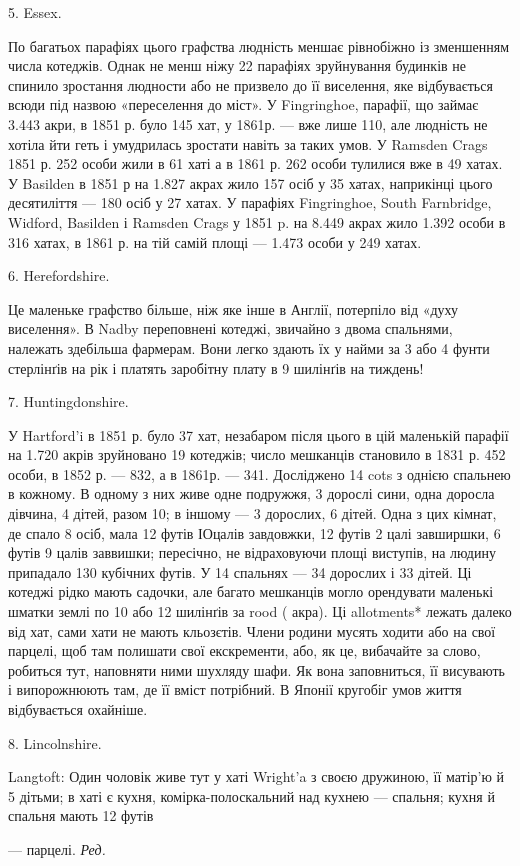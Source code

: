 5. Essex.

По багатьох парафіях цього графства людність меншає рівнобіжно
із зменшенням числа котеджів. Однак не менш ніжу
22 парафіях зруйнування будинків не спинило зростання людности
або не призвело до її виселення, яке відбувається всюди під
назвою «переселення до міст». У Fingringhoe, парафії, що займає
3.443 акри, в 1851 р. було 145 хат, у 1861р. — вже лише 110, але
людність не хотіла йти геть і умудрилась зростати навіть за
таких умов. У Ramsden Crags 1851 р. 252 особи жили в 61 хаті
а в 1861 р. 262 особи тулилися вже в 49 хатах. У Basilden в 1851 р
на 1.827 акрах жило 157 осіб у 35 хатах, наприкінці цього десятиліття
— 180 осіб у 27 хатах. У парафіях Fingringhoe, South
Farnbridge, Widford, Basilden і Ramsden Crags у 1851 p. на
8.449 акрах жило 1.392 особи в 316 хатах, в 1861 р. на тій самій
площі — 1.473 особи у 249 хатах.

6. Herefordshire.

Це маленьке графство більше, ніж яке інше в Англії, потерпіло
від «духу виселення». В Nadby переповнені котеджі,
звичайно з двома спальнями, належать здебільша фармерам.
Вони легко здають їх у найми за 3 або 4 фунти стерлінґів на рік
і платять заробітну плату в 9 шилінґів на тиждень!

7. Huntingdonshire.

У Hartford’i в 1851 р. було 37 хат, незабаром після цього
в цій маленькій парафії на 1.720 акрів зруйновано 19 котеджів;
число мешканців становило в 1831 р. 452 особи, в 1852 р. — 832,
а в 1861р. — 341. Досліджено 14 cots з однією спальнею в кожному.
В одному з них живе одне подружжя, 3 дорослі сини, одна
доросла дівчина, 4 дітей, разом 10; в іншому — 3 дорослих,
6 дітей. Одна з цих кімнат, де спало 8 осіб, мала 12 футів ІОцалів
завдовжки, 12 футів 2 цалі завширшки, 6 футів 9 цалів заввишки;
пересічно, не відраховуючи площі виступів, на людину припадало
130 кубічних футів. У 14 спальнях — 34 дорослих і 33 дітей. Ці
котеджі рідко мають садочки, але багато мешканців могло орендувати
маленькі шматки землі по 10 або 12 шилінґів за rood ( акра).
Ці allotments* лежать далеко від хат, сами хати не мають кльозєтів.
Члени родини мусять ходити або на свої парцелі, щоб там
полишати свої екскременти, або, як це, вибачайте за слово, робиться
тут, наповняти ними шухляду шафи. Як вона заповниться,
її висувають і випорожнюють там, де її вміст потрібний. В Японії
кругобіг умов життя відбувається охайніше.

8. Lincolnshire.

Langtoft: Один чоловік живе тут у хаті Wright’a з своєю дружиною,
її матір’ю й 5 дітьми; в хаті є кухня, комірка-полоскальний
над кухнею — спальня; кухня й спальня мають 12 футів

— парцелі. \emph{Ред.}
